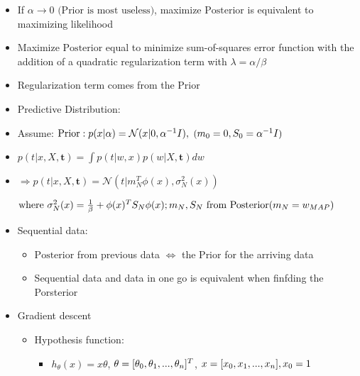 \begin{itemize}
\item If $\alpha \to 0 \text { (Prior is most useless)}$, maximize $\text{Posterior}$ is equivalent to maximizing likelihood 
\item Maximize $\text{Posterior}$ equal to minimize sum-of-squares error function with the addition of a quadratic regularization term with $\lambda = \alpha/\beta$ 
\item Regularization term comes from the $\text{Prior}$ 

\item Predictive Distribution:

\item Assume: $\text{Prior}: p(x|\alpha) = \mathcal N(x|0,\alpha^{-1}I),\space \small\text{ (}m_0=0,S_0=\alpha^{-1}I \text{)}$ 

\item $\displaystyle p(t|x,X,\boldsymbol t) = \int p(t|w,x)p(w|X,\boldsymbol t)dw$ 

\item $\Rightarrow p(t|x,X,\boldsymbol t) = \mathcal N(t|m_N^T\phi(x),\sigma^2_N(x))$ 

	$\text{where } \sigma_N^2(x)=\frac 1 \beta + \phi(x)^TS_N\phi(x);\space m_N, S_N \text{ from Posterior} \small (m_N=w_{MAP})$ 

\item Sequential data:

	\begin{itemize}
	\item $\text{Posterior}$ from previous data $\Leftrightarrow$ the $\text{Prior}$ for the arriving data
	\item Sequential data and data in one go is equivalent when finfding the Porsterior
	\end{itemize}

\item Gradient descent

	\begin{itemize}
	\item Hypothesis function: 
		\begin{itemize}
		\item $h_\theta(x)=x\theta$, $\small\theta = [\theta_0, \theta_1, ..., \theta_n]^T$, $\small x=[x_0, x_1,..., x_n], x_0=1$
		\end{itemize}
	

\end{itemize}
\end{itemize}
